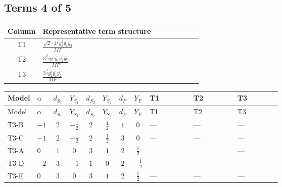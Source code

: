 \documentclass[8pt]{article}
\begin{document}
\begin{landscape}
\subsection*{Terms 4 of 5}
\begin{center}
\begin{tabular}{@{}c >{\raggedright\arraybackslash}p{0.82\linewidth}@{}}
\toprule
Column & Representative term structure \\
\midrule
T1 & \(\displaystyle \frac{\sqrt{2} \cdot 3^{\frac{3}{4}} g_{2}^{2} \overline{y_{1}} \overline{y_{2}}}{MF}\) \\
\midrule
T2 & \(\displaystyle \frac{3^{\frac{3}{4}} i ye \overline{y_{1}} \overline{y_{2}} \overline{ye}}{MF}\) \\
\midrule
T3 & \(\displaystyle \frac{3^{\frac{3}{4}} g_{2}^{2} \overline{y_{1}} \overline{y_{2}}}{MF}\) \\
\midrule
\bottomrule
\end{tabular}
\end{center}
\smallskip
\tiny
\begin{longtable}{@{}llcccccc >{\raggedright\arraybackslash}p{0.21\linewidth} >{\raggedright\arraybackslash}p{0.21\linewidth} >{\raggedright\arraybackslash}p{0.21\linewidth}@{}}
\toprule
Model & $\alpha$ & $d_{S_1}$ & $Y_{S_1}$ & $d_{S_2}$ & $Y_{S_2}$ & $d_F$ & $Y_F$ & T1 & T2 & T3 \\
\midrule
\endfirsthead
\toprule
Model & $\alpha$ & $d_{S_1}$ & $Y_{S_1}$ & $d_{S_2}$ & $Y_{S_2}$ & $d_F$ & $Y_F$ & T1 & T2 & T3 \\
\midrule
\endhead
T3-B & $-1$ & $2$ & $-\frac{1}{2}$ & $2$ & $\frac{1}{2}$ & $1$ & $0$ & --- & --- & --- \\
\midrule
T3-C & $-1$ & $2$ & $-\frac{1}{2}$ & $2$ & $\frac{1}{2}$ & $3$ & $0$ & --- & --- & --- \\
\midrule
T3-A & $0$ & $1$ & $0$ & $3$ & $1$ & $2$ & $\frac{1}{2}$ & \scriptsize\adjustbox{max width=\linewidth}{$\begin{gathered} \frac{\sqrt{2} \cdot 3^{\frac{3}{4}} g_{2}^{2} \overline{y_{1}} \overline{y_{2}}}{3 MF}\end{gathered}$} & \scriptsize\adjustbox{max width=\linewidth}{$\begin{gathered} \frac{3^{\frac{3}{4}} i ye \overline{y_{1}} \overline{y_{2}} \overline{ye}}{12 MF}\end{gathered}$} & --- \\
\midrule
T3-D & $-2$ & $3$ & $-1$ & $1$ & $0$ & $2$ & $-\frac{1}{2}$ & \scriptsize\adjustbox{max width=\linewidth}{$\begin{gathered} - \frac{\sqrt{2} \cdot 3^{\frac{3}{4}} g_{2}^{2} \overline{y_{1}} \overline{y_{2}}}{3 MF}\end{gathered}$} & --- & \scriptsize\adjustbox{max width=\linewidth}{$\begin{gathered} - \frac{17 \cdot 3^{\frac{3}{4}} g_{2}^{2} \overline{y_{1}} \overline{y_{2}}}{24 MF}\end{gathered}$} \\
\midrule
T3-E & $0$ & $3$ & $0$ & $3$ & $1$ & $2$ & $\frac{1}{2}$ & --- & --- & --- \\
\midrule
\bottomrule
\end{longtable}
\clearpage

\end{landscape}
\end{document}
